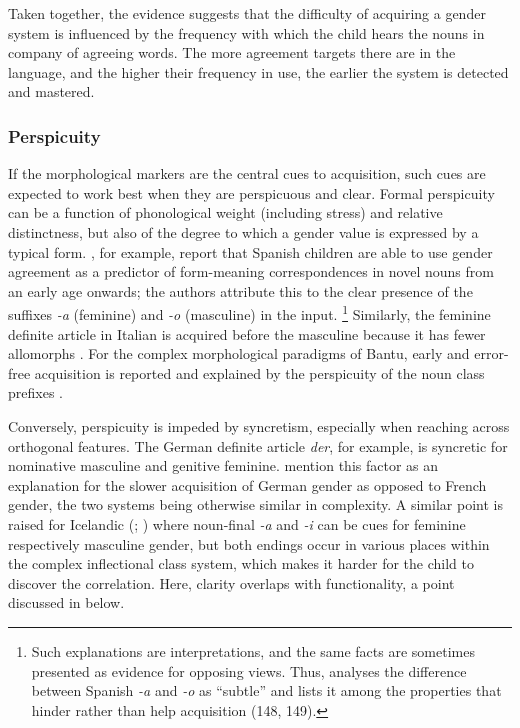 \documentclass[output=collectionpaper]{langsci/langscibook}
\begin{document}
Taken together, the evidence suggests that the difficulty of acquiring a gender system is influenced by the frequency with which the child hears the nouns in company of agreeing words. The more agreement targets there are in the language, and the higher their frequency in use, the earlier the system is detected and mastered.

\subsubsection{Perspicuity}
\label{sec:Audr:4.2.2}

If the morphological markers are the central cues to acquisition, such cues are expected to work best when they are perspicuous and clear. Formal perspicuity can be a function of phonological weight (including stress) and relative distinctness, but also of the degree to which a gender value is expressed by a typical form. \citet{Arias-Trejo2013}, for example, report that Spanish children are able to use gender agreement as a predictor of form-meaning correspondences in novel nouns from an early age onwards; the authors attribute this to the clear presence of the suffixes \textit{-a} (feminine) and \textit{-o} (masculine) in the input.%
\footnote{Such explanations are interpretations, and the same facts are sometimes presented as evidence for opposing views. Thus, \citet{Mariscal2009} analyses the difference between Spanish \textit{-a} and \textit{-o} as ``subtle'' and lists it among the properties that hinder rather than help acquisition (148, 149).} %
Similarly, the feminine definite article in Italian is acquired before the masculine because it has fewer allomorphs \citep[514]{Pizzuto1992}. For the complex morphological paradigms of Bantu, early and error-free acquisition is reported and explained by the perspicuity of the noun class prefixes \citep[213]{Demuth2003}.

Conversely, perspicuity is impeded by syncretism, especially when reaching across orthogonal features. The German definite article \textit{der}, for example, is syncretic for nominative masculine and genitive feminine. \citet{Eichler2013} mention this factor as an explanation for the slower acquisition of German gender as opposed to French gender, the two systems being otherwise similar in complexity. A similar point is raised for Icelandic (\citealt{Mulford1985}; \citealt{Levy1988}) where noun-final \textit{-a} and \textit{-i} can be cues for feminine respectively masculine gender, but both endings occur in various places within the complex inflectional class system, which makes it harder for the child to discover the correlation. Here, clarity overlaps with functionality, a point discussed in  below.
\end{document}
